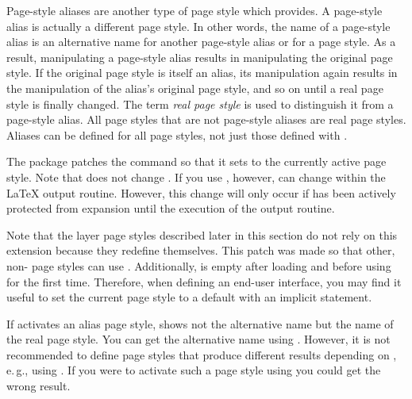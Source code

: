 Page-style aliases are another type of page style which 
provides. A page-style alias is actually a different page style. In other
words, the name of a page-style alias is an alternative name for another
page-style alias or for a page style. As a result, manipulating a page-style
alias results in manipulating the original page style. If the original page
style is itself an alias, its manipulation again results in the manipulation
of the alias's original page style, and so on until a real page style is
finally changed. The term \emph{real page style} is
used to distinguish it from a page-style alias. All page styles that are not
page-style aliases are real page styles. Aliases can be defined for all page
styles, not just those defined with .

\begin{Declaration}
\end{Declaration}
The  package patches the 
command so that it sets  to the currently active page
style. Note that  does not change
. If you use ,
however,  can change within the \LaTeX{} output
routine. However, this change will only occur if  has
been actively protected from expansion until the execution of the output
routine.

Note that the layer page styles described later in this section do not rely on
this  extension because they redefine
 themselves. This patch was made so that other,
non- page styles can use .
Additionally,  is empty after loading
 and before using  for the
first time. Therefore, when defining an end-user interface, you may find it
useful to set the current page style to a default with an implicit
 statement.

If  activates an alias page style,
 shows not the alternative name but the name of
the real page style. You can get the
alternative name using . However, it is not
recommended to define page styles that produce different results depending on
, e.\,g., using . If you
were to activate such a page style using 
you could get the wrong result.%
\EndIndexGroup


